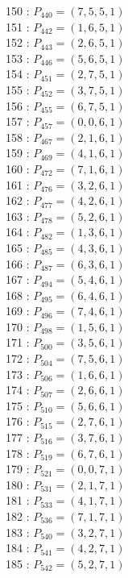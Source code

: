 \documentclass{article}
\begin{document}
{\begin{multicols}{3}
150 : $P_{440}=( 7, 5, 5, 1 )$\\
151 : $P_{442}=( 1, 6, 5, 1 )$\\
152 : $P_{443}=( 2, 6, 5, 1 )$\\
153 : $P_{446}=( 5, 6, 5, 1 )$\\
154 : $P_{451}=( 2, 7, 5, 1 )$\\
155 : $P_{452}=( 3, 7, 5, 1 )$\\
156 : $P_{455}=( 6, 7, 5, 1 )$\\
157 : $P_{457}=( 0, 0, 6, 1 )$\\
158 : $P_{467}=( 2, 1, 6, 1 )$\\
159 : $P_{469}=( 4, 1, 6, 1 )$\\
160 : $P_{472}=( 7, 1, 6, 1 )$\\
161 : $P_{476}=( 3, 2, 6, 1 )$\\
162 : $P_{477}=( 4, 2, 6, 1 )$\\
163 : $P_{478}=( 5, 2, 6, 1 )$\\
164 : $P_{482}=( 1, 3, 6, 1 )$\\
165 : $P_{485}=( 4, 3, 6, 1 )$\\
166 : $P_{487}=( 6, 3, 6, 1 )$\\
167 : $P_{494}=( 5, 4, 6, 1 )$\\
168 : $P_{495}=( 6, 4, 6, 1 )$\\
169 : $P_{496}=( 7, 4, 6, 1 )$\\
170 : $P_{498}=( 1, 5, 6, 1 )$\\
171 : $P_{500}=( 3, 5, 6, 1 )$\\
172 : $P_{504}=( 7, 5, 6, 1 )$\\
173 : $P_{506}=( 1, 6, 6, 1 )$\\
174 : $P_{507}=( 2, 6, 6, 1 )$\\
175 : $P_{510}=( 5, 6, 6, 1 )$\\
176 : $P_{515}=( 2, 7, 6, 1 )$\\
177 : $P_{516}=( 3, 7, 6, 1 )$\\
178 : $P_{519}=( 6, 7, 6, 1 )$\\
179 : $P_{521}=( 0, 0, 7, 1 )$\\
180 : $P_{531}=( 2, 1, 7, 1 )$\\
181 : $P_{533}=( 4, 1, 7, 1 )$\\
182 : $P_{536}=( 7, 1, 7, 1 )$\\
183 : $P_{540}=( 3, 2, 7, 1 )$\\
184 : $P_{541}=( 4, 2, 7, 1 )$\\
185 : $P_{542}=( 5, 2, 7, 1 )$\\

\end{multicols}}
\end{document}
